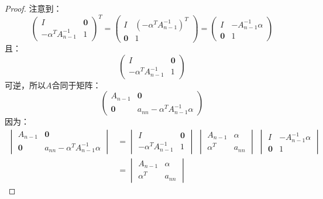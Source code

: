 \begin{proof}
	注意到：
	\begin{equation*}
		\begin{pmatrix}
			I & \mathbf{0} \\
			-\alpha^TA_{n-1}^{-1} & 1
		\end{pmatrix}^T
		=
		\begin{pmatrix}
			I & (-\alpha^TA_{n-1}^{-1})^T \\
			\mathbf{0} & 1
		\end{pmatrix}
		=
		\begin{pmatrix}
			I & -A_{n-1}^{-1}\alpha \\
			\mathbf{0} & 1
		\end{pmatrix}
	\end{equation*}
	且：
	\begin{equation*}
		\begin{pmatrix}
			I & \mathbf{0} \\
			-\alpha^TA_{n-1}^{-1} & 1
		\end{pmatrix}
	\end{equation*}
	可逆，所以$A$合同于矩阵：
	\begin{equation*}
		\begin{pmatrix}
			A_{n-1} & \mathbf{0} \\
			\mathbf{0} & a_{nn}-\alpha^TA_{n-1}^{-1}\alpha
		\end{pmatrix}
	\end{equation*}
	因为：
	\begin{align*}
		\begin{vmatrix}
			A_{n-1} & \mathbf{0} \\
			\mathbf{0} & a_{nn}-\alpha^TA_{n-1}^{-1}\alpha
		\end{vmatrix}
		&=
		\begin{vmatrix}
			I & \mathbf{0} \\
			-\alpha^TA_{n-1}^{-1} & 1
		\end{vmatrix}\;
		\begin{vmatrix}
			A_{n-1} & \alpha \\
			\alpha^T & a_{nn}
		\end{vmatrix}\;
		\begin{vmatrix}
			I & -A_{n-1}^{-1}\alpha \\
			\mathbf{0} & 1
		\end{vmatrix} \\
		&=
		\begin{vmatrix}
			A_{n-1} & \alpha \\
			\alpha^T & a_{nn}
		\end{vmatrix}

\end{align*}
\end{proof}
